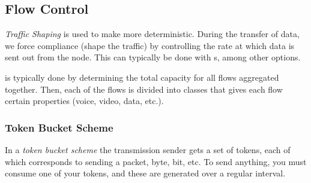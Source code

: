 \subsection{Flow Control}\label{subsec:Flow_Control}

\begin{definition}\label{def:Traffic_Shaping}
  \emph{Traffic Shaping} is used to make  more deterministic.
  During the transfer of data, we force compliance (shape the traffic) by controlling the rate at which data is sent out from the node.
  This can typically be done with s, among other options.
\end{definition}

 is typically done by determining the total capacity for all flows aggregated together.
Then, each of the flows is divided into classes that gives each flow certain properties (voice, video, data, etc.).

\begin{algorithm}[H]
  \DontPrintSemicolon{}
  \BlankLine{}

\end{algorithm}

\subsubsection{Token Bucket Scheme}\label{subsubsec:Token_Bucket_Scheme}
\begin{definition}\label{def:Token_Bucket_Scheme}
  In a \emph{token bucket scheme} the transmission sender gets a set of tokens, each of which corresponds to sending a packet, byte, bit, etc.
  To send anything, you must consume one of your tokens, and these are generated over a regular interval.
\end{definition}

